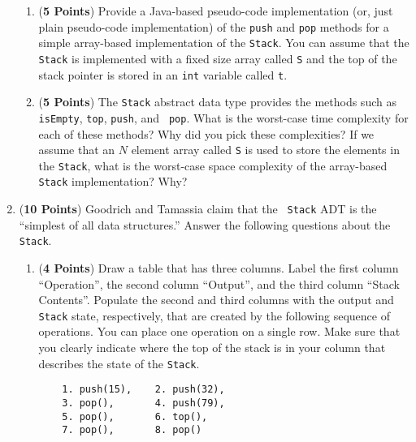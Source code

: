 \documentclass[12pt]{article}
\begin{document}
\begin{enumerate}
  \begin{enumerate}

  \item ({\bf 5 Points}) Provide a Java-based pseudo-code
    implementation (or, just plain pseudo-code implementation) of the
    {\tt push} and {\tt pop} methods for a simple array-based
    implementation of the {\tt Stack}.  You can assume that the {\tt
      Stack} is implemented with a fixed size array called {\tt S} and
    the top of the stack pointer is stored in an {\tt int} variable
    called {\tt t}.

  \item ({\bf 5 Points}) The {\tt Stack} abstract data type provides
    the methods such as {\tt isEmpty}, {\tt top}, {\tt push}, and {\tt
      pop}.  What is the worst-case time complexity for each of these
    methods?  Why did you pick these complexities? If we assume that
    an $N$ element array called {\tt S} is used to store the elements
    in the {\tt Stack}, what is the worst-case space complexity of the
    array-based {\tt Stack} implementation? Why?


  \end{enumerate}

\newpage

\item ({\bf 10 Points}) Goodrich and Tamassia claim that the {\tt
  Stack} ADT is the ``simplest of all data structures.''  Answer the
  following questions about the {\tt Stack}.

\begin{enumerate}

\item ({\bf 4 Points}) Draw a table that has three columns.  Label the
  first column ``Operation'', the second column ``Output'', and the
  third column ``Stack Contents''.  Populate the second and third
  columns with the output and {\tt Stack} state, respectively, that
  are created by the following sequence of operations.  You can place
  one operation on a single row.  Make sure that you clearly indicate
  where the top of the stack is in your column that describes the
  state of the {\tt Stack}.

  \begin{verbatim} 
    1. push(15),    2. push(32), 
    3. pop(),       4. push(79),
    5. pop(),       6. top(), 
    7. pop(),       8. pop() 
  \end{verbatim}


\end{enumerate}
\end{enumerate}
\end{document}
